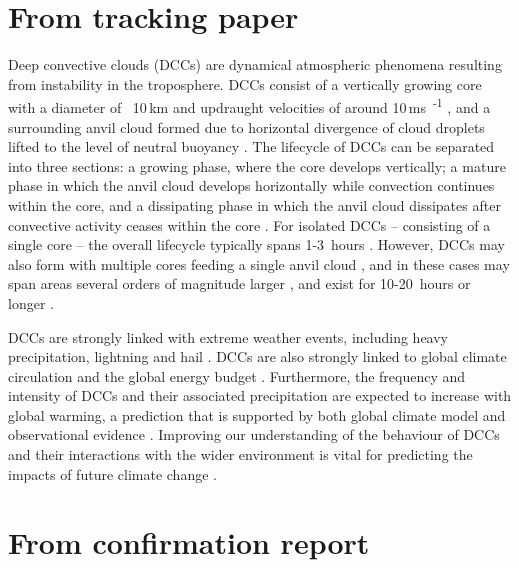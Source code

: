 \section{From tracking paper}


Deep convective clouds (DCCs) are dynamical atmospheric phenomena resulting from instability in the troposphere.
DCCs consist of a vertically growing core with a diameter of ~10\,\unit{km} and updraught velocities of around 10\,\unit{ms\textsuperscript{-1}} \citep{weisman_mesoscale_2015}, and a surrounding anvil cloud formed due to horizontal divergence of cloud droplets lifted to the level of neutral buoyancy \citep{houze_chapter_2014}.
The lifecycle of DCCs can be separated into three sections: a growing phase, where the core develops vertically; a mature phase in which the anvil cloud develops horizontally while convection continues within the core, and a dissipating phase in which the anvil cloud dissipates after convective activity ceases within the core \citep{wall_life_2018}.
For isolated DCCs -- consisting of a single core -- the overall lifecycle typically spans 1-3~hours \citep{chen_diurnal_1997}.
However, DCCs may also form with multiple cores feeding a single anvil cloud \citep{roca_simple_2017}, and in these cases may span areas several orders of magnitude larger \citep{houze_mesoscale_2004}, and exist for 10-20~hours or longer \citep{chen_diurnal_1997}.

DCCs are strongly linked with extreme weather events, including heavy precipitation, lightning and hail \citep{westra_future_2014, houze_chapter_2014, williams_radar_1992, bruning_theory_2013, punge_hail_2016, matsudo_severe_2011}. 
DCCs are also strongly linked to global climate circulation and the global energy budget \citep{houze_mesoscale_2004, fritsch_mesoscale_2001, johnson_mesoscale_2001}.
Furthermore, the frequency and intensity of DCCs and their associated precipitation are expected to increase with global warming, a prediction that is supported by both global climate model \citep{allen_constraints_2002, trenberth_changing_2003, held_robust_2006, muller_energetic_2011, ogorman_energetic_2012, ogorman_precipitation_2015} and observational evidence \citep{tan_increases_2015, berg_strong_2013, aumann_increased_2018, houze_extreme_2019}.
Improving our understanding of the behaviour of DCCs and their interactions with the wider environment is vital for predicting the impacts of future climate change \citep{westra_future_2014}.


\section{From confirmation report}

